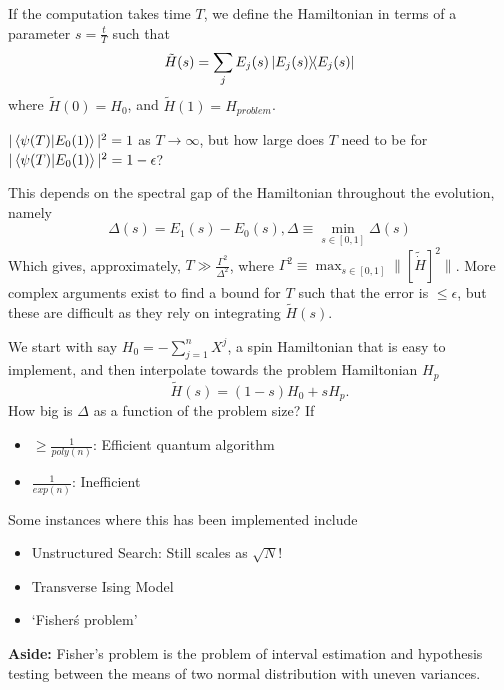 \documentclass[11pt]{article}
\begin{document}
If the computation takes time $T$, we define the Hamiltonian in terms of a parameter $s=\frac{t}{T}$ such that
\begin{equation}
    \tilde{H}(s)=\sum_{j}E_{j}(s)\ketbra{E_{j}(s)}{E_{j}(s)}
\end{equation}
where $\tilde{H}(0)=H_{0}$, and $\tilde{H}(1)=H_{problem}$.

$|\braket{\psi(T)}{E_{0}(1)}|^{2}=1$ as $T\rightarrow\infty$, but how large does $T$ need to be for $|\braket{\psi(T)}{E_{0}(1)}|^{2}=1-\epsilon$?

This depends on the spectral gap of the Hamiltonian throughout the evolution, namely
\begin{equation}
    \Delta(s)=E_{1}(s)-E_{0}(s), \Delta \equiv \min_{s\in[0,1]}\Delta(s)
\end{equation}
Which gives, approximately, $T\gg \frac{\Gamma^{2}}{\Delta^{2}}$, where $\Gamma^{2}\equiv \max_{s\in[0,1]}\|[\tilde{\dot{H}}]^{2}\|$.
More complex arguments exist to find a bound for $T$ such  that the error is $\leq \epsilon$, but these are difficult as they rely on integrating $\tilde{H}(s)$.

We start with say $H_{0}=-\sum_{j=1}^{n}X^{j}$, a spin Hamiltonian that is easy to implement, and then interpolate towards the problem Hamiltonian $H_{p}$
\begin{equation}
    \tilde{H}(s)=(1-s)H_{0} + sH_{p}.
\end{equation}
How big is $\Delta$ as a function of the problem size?
If
\begin{itemize}
    \item $\geq\frac{1}{poly(n)}$: Efficient quantum algorithm
    \item $\frac{1}{exp(n)}$: Inefficient
\end{itemize}

Some instances where this has been implemented include
\begin{itemize}
    \item Unstructured Search: Still scales as $\sqrt{N}$!
    \item Transverse Ising Model
    \item `Fisher\'s problem'
\end{itemize}

\hrulefill

\textbf{Aside:} Fisher's problem is the problem of interval estimation and hypothesis testing between the means of two normal distribution with uneven variances.

\hrulefill
\end{document}

